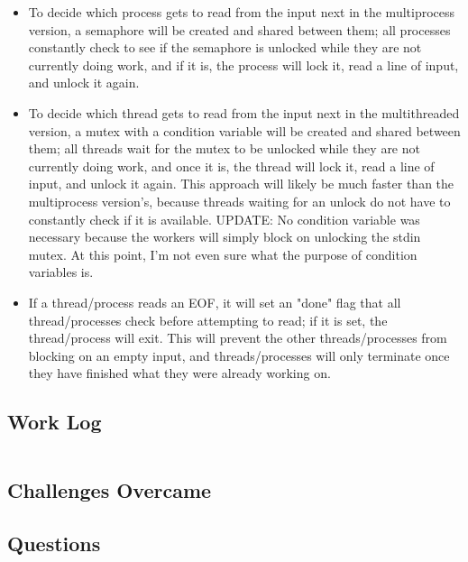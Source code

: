 \documentclass[letterpaper,10pt,fleqn]{article}
\numberwithin{equation}{section}
\begin{document}
\begin{itemize}
    \item To decide which process gets to read from the input next in the multiprocess version, a semaphore will be created and shared between them; all processes constantly check to see if the semaphore is unlocked while they are not currently doing work, and if it is, the process will lock it, read a line of input, and unlock it again.
    \item To decide which thread gets to read from the input next in the multithreaded version, a mutex with a condition variable will be created and shared between them; all threads wait for the mutex to be unlocked while they are not currently doing work, and once it is, the thread will lock it, read a line of input, and unlock it again.  This approach will likely be much faster than the multiprocess version's, because threads waiting for an unlock do not have to constantly check if it is available.  UPDATE: No condition variable was necessary because the workers will simply block on unlocking the stdin mutex.  At this point, I'm not even sure what the purpose of condition variables is.
    \item If a thread/process reads an EOF, it will set an "done" flag that all thread/processes check before attempting to read; if it is set, the thread/process will exit.  This will prevent the other threads/processes from blocking on an empty input, and threads/processes will only terminate once they have finished what they were already working on.
\end{itemize}

\subsection*{Work Log}
\begin{verbatim}
\end{verbatim}

\subsection*{Challenges Overcame}
\begin{itemize}
\end{itemize}

\subsection*{Questions}
\begin{enumerate}
\end{enumerate}
\end{document}
